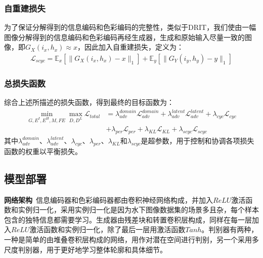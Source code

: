 \subsubsection{自重建损失}

为了保证分解得到的信息编码和色彩编码的完整性，类似于DRIT\cite{lee2018diverse}，我们使由一幅图像分解得到的信息编码和色彩编码再经生成器，生成和原始输入尽量一致的图像，即$G_X(i_x, h_x)\approx x$，因此加入自重建损失，定义为：
\begin{equation}
\begin{split}
\mathcal{L}_{scyc}=\mathbb{E}_x[\parallel G_X(i_x, h_x)-x\parallel_1] + \mathbb{E}_y[\parallel G_Y(i_y, h_y)-y\parallel_1]
\end{split}
\label{eq:self_cyc}
\end{equation}

\subsubsection{总损失函数}

综合上述所描述的损失函数，得到最终的目标函数为：
\begin{equation}
\begin{split}
\min \limits_{G, E^I, E^H, M, FE} \max \limits_{D, D^L} \mathcal{L}_{total} 
& = \lambda_{adv}^{domain}\mathcal{L}_{adv}^{domain} + \lambda_{adv}^{latent}\mathcal{L}_{adv}^{latent}+ \lambda_{cyc}\mathcal{L}_{cyc} \\
& + \lambda_{per}\mathcal{L}_{per} + \lambda_{KL}\mathcal{L}_{KL} + \lambda_{scyc}\mathcal{L}_{scyc}
\end{split}
\label{eq:total}
\end{equation}
其中$\lambda_{adv}^{domain}$、$\lambda_{adv}^{latent}$、$\lambda_{cyc}$、$\lambda_{per}$、$\lambda_{KL}$和$\lambda_{scyc}$是超参数，用于控制和协调各项损失函数的权重以平衡损失。

\subsection{模型部署}

\textbf{网络架构}~信息编码器和色彩编码器都由卷积神经网络构成，并加入$ReLU$激活函数\cite{nair2010rectified}和实例归一化\cite{ulyanov2016instance}，采用实例归一化是因为水下图像数据集的场景多且杂，每个样本包含的独特信息都需要学习。生成器由残差块和转置卷积层构成，同样在每一层加入$ReLU$激活函数和实例归一化，除了最后一层用激活函数$Tanh$。判别器有两种，一种是简单的由堆叠卷积层构成的网络，用作对潜在空间进行判别，另一个采用多尺度判别器\cite{wang2018high}，用于更好地学习整体轮廓和具体细节。

